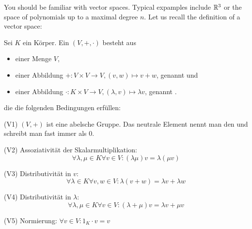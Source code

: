 

You should be familiar with vector spaces. Typical expamples include $\mathbb{R}^3$ or the space of polynomials up to a maximal degree $n$. Let us recall the definition of a vector space:

\begin{definition}[Vektorräume]\label{vektorraeume:def}
	Sei $K$ ein Körper. Ein  $(V,+,\cdot)$ besteht aus
	\begin{itemize}
		\item einer Menge $V$,
		\item einer Abbildung $+: V \times V \to V, (v,w) \mapsto v+w$, genannt  und
		\item einer Abbildung $\cdot: K \times V \to V, (\lambda,v) \mapsto \lambda v$, genannt .
	\end{itemize}
	die die folgenden Bedingungen erfüllen:
	\begin{description}
		\item{(V1)} $(V,+)$ ist eine abelsche Gruppe. Das neutrale Element nennt man den  und schreibt man fast immer als $0$.
		\item{(V2)} Assoziativität der Skalarmultiplikation:
		\[\forall\lambda,\mu\in K \forall v\in V: (\lambda \mu)v = \lambda(\mu v)\]
		\item{(V3)} Distributivität in $v$:
		\[\forall\lambda\in K \forall v,w\in V: \lambda (v+w) = \lambda v + \lambda w\]
		\item{(V4)} Distributivität in $\lambda$:
		\[\forall\lambda,\mu\in K \forall v\in V: (\lambda+\mu) v = \lambda v + \mu v\]
		\item{(V5)} Normierung: $\forall v\in V: 1_K \cdot v=v$
	\end{description}
\end{definition}

